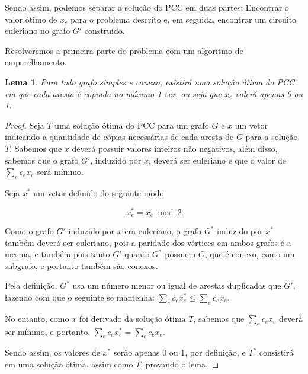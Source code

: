 \documentclass{article}
\newtheorem{lemma}{Lema}
\begin{document}
Sendo assim, podemos separar a solução do PCC em duas partes: Encontrar o valor ótimo de $x_e$ para o problema descrito e, em seguida, encontrar um circuito euleriano no grafo $G'$ construído.

Resolveremos a primeira parte do problema com um algoritmo de emparelhamento.



\begin{lemma} 
    \label{lemma-pcc}
    Para todo grafo simples e conexo, existirá uma solução ótima do PCC em que cada aresta é copiada no máximo 1 vez, ou seja que $x_e$ valerá apenas 0 ou 1. 
\end{lemma}

\begin{proof}
    Seja $T$ uma solução ótima do PCC para um grafo $G$ e $x$ um vetor indicando a quantidade de cópias necessárias de cada aresta de $G$ para a solução $T$. 
    Sabemos que $x$ deverá possuir valores inteiros não negativos, além disso, sabemos que o grafo $G'$, induzido por $x$, deverá ser euleriano e que o valor de $\sum_e c_ex_e$ será mínimo.

    Seja $x^*$ um vetor definido do seguinte modo:

    \[  x^*_e = x_e \bmod 2    \]

    Como o grafo $G'$ induzido por $x$ era euleriano, o grafo $G^*$ induzido por $x^*$ também deverá ser euleriano, pois a paridade dos vértices em ambos grafos é a mesma, e também pois tanto $G'$ quanto $G^*$ possuem $G$, que é conexo, como um subgrafo, e portanto também são conexos.
    
    Pela definição, $G^*$ usa um número menor ou igual de arestas duplicadas que $G'$, fazendo com que o seguinte se mantenha: $\sum_e c_ex^*_e \leq \sum_e c_ex_e$.

    No entanto, como $x$ foi derivado da solução ótima $T$, sabemos que $\sum_e c_ex_e$ deverá ser mínimo, e portanto, $\sum_e c_ex^*_e = \sum_e c_ex_e$. 

    Sendo assim, os valores de $x^*$ serão apenas 0 ou 1, por definição, e $T^*$ consistirá em uma solução ótima, assim como $T$, provando o lema.

\end{proof}
\end{document}
